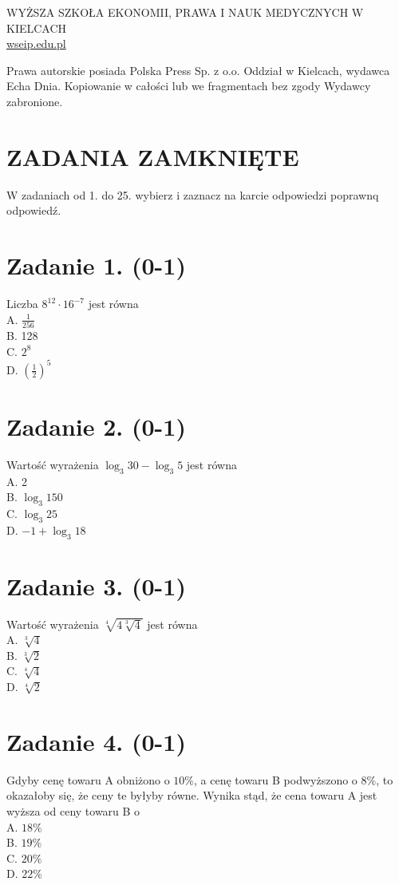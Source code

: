 \documentclass[10pt]{article}
\begin{document}
WYŻSZA SZKOŁA EKONOMII, PRAWA I NAUK MEDYCZNYCH W KIELCACH\\
\href{http://wseip.edu.pl}{wseip.edu.pl}

Prawa autorskie posiada Polska Press Sp. z o.o. Oddział w Kielcach, wydawca Echa Dnia. Kopiowanie w całości lub we fragmentach bez zgody Wydawcy zabronione.

\section*{ZADANIA ZAMKNIĘTE}
W zadaniach od 1. do 25. wybierz i zaznacz na karcie odpowiedzi poprawnq odpowiedź.

\section*{Zadanie 1. (0-1)}
Liczba \(8^{12} \cdot 16^{-7}\) jest równa\\
A. \(\frac{1}{256}\)\\
B. 128\\
C. \(2^{8}\)\\
D. \(\left(\frac{1}{2}\right)^{5}\)

\section*{Zadanie 2. (0-1)}
Wartość wyrażenia \(\log _{3} 30-\log _{3} 5\) jest równa\\
A. 2\\
B. \(\log _{3} 150\)\\
C. \(\log _{3} 25\)\\
D. \(-1+\log _{3} 18\)

\section*{Zadanie 3. (0-1)}
Wartość wyrażenia \(\sqrt[4]{4 \sqrt[3]{4}}\) jest równa\\
A. \(\sqrt[3]{4}\)\\
B. \(\sqrt[3]{2}\)\\
C. \(\sqrt[4]{4}\)\\
D. \(\sqrt[4]{2}\)

\section*{Zadanie 4. (0-1)}
Gdyby cenę towaru A obniżono o \(10 \%\), a cenę towaru B podwyższono o \(8 \%\), to okazałoby się, że ceny te byłyby równe. Wynika stąd, że cena towaru A jest wyższa od ceny towaru B o\\
A. \(18 \%\)\\
B. \(19 \%\)\\
C. \(20 \%\)\\
D. \(22 \%\)
\end{document}
